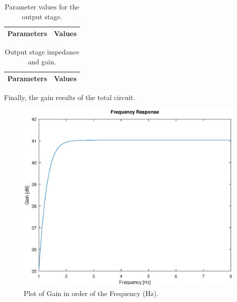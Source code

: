 \begin{table}[h]
  \centering
  \begin{tabular}{|l|r|}
    \hline    
    {\bf Parameters} & {\bf Values} \\ \hline
    
  \end{tabular}
  \caption{Parameter values for the output stage.}
  \label{tab:4}
\end{table}

\begin{table}[h]
  \centering
  \begin{tabular}{|l|r|}
    \hline    
    {\bf Parameters} & {\bf Values} \\ \hline
    
  \end{tabular}
  \caption{Output stage impedance and gain.}
  \label{tab:5}
\end{table}

Finally, the gain results of the total circuit.

\begin{figure}[h] \centering
\includegraphics[width=0.6\linewidth]{freqresponse.eps}
\caption{Plot of Gain in order of the Frequency (Hz).}
\label{fig:plotA1}
\end{figure}
